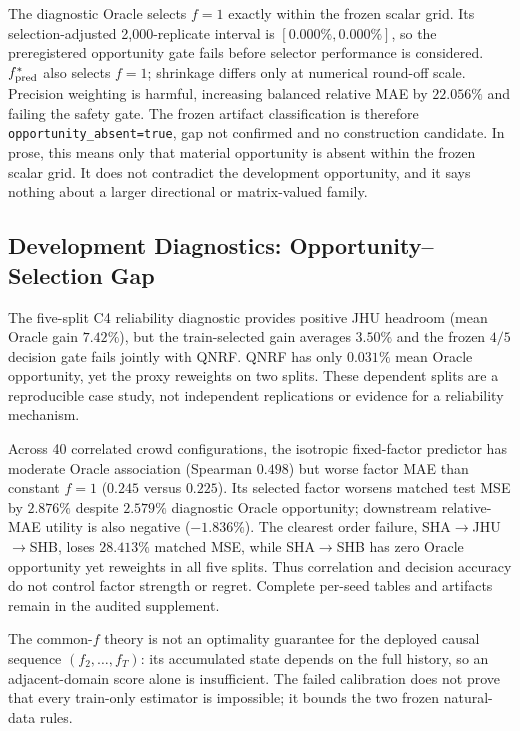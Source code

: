 \documentclass[10pt]{article}
\begin{document}
The diagnostic Oracle selects $f=1$ exactly within the frozen scalar grid. Its
selection-adjusted
2,000-replicate interval is $[0.000\%,0.000\%]$, so the preregistered
opportunity gate fails before selector performance is considered.
$f^*_{\rm pred}$ also selects $f=1$; shrinkage differs only at numerical
round-off scale.  Precision weighting is harmful, increasing balanced
relative MAE by $22.056\%$ and failing the safety gate.  The frozen
artifact classification is therefore \texttt{opportunity\_absent=true}, gap
not confirmed and no construction candidate. In prose, this means only that
material opportunity is absent within the frozen scalar grid. It does not
contradict the development opportunity, and it says nothing about a larger
directional or matrix-valued family.

\FloatBarrier
\subsection{Development Diagnostics: Opportunity--Selection Gap}

The five-split C4 reliability diagnostic provides positive JHU headroom
(mean Oracle gain $7.42\%$), but the train-selected gain averages $3.50\%$
and the frozen $4/5$ decision gate fails jointly with QNRF.  QNRF has only
$0.031\%$ mean Oracle opportunity, yet the proxy reweights on two splits.
These dependent splits are a reproducible case study, not independent
replications or evidence for a reliability mechanism.

Across 40 correlated crowd configurations, the isotropic fixed-factor
predictor has moderate Oracle association (Spearman $0.498$) but worse factor
MAE than constant $f=1$ ($0.245$ versus $0.225$).  Its selected factor worsens
matched test MSE by $2.876\%$ despite $2.579\%$ diagnostic Oracle opportunity;
downstream relative-MAE utility is also negative ($-1.836\%$).  The clearest
order failure, SHA$\to$JHU$\to$SHB, loses $28.413\%$ matched MSE, while
SHA$\to$SHB has zero Oracle opportunity yet reweights in all five splits.
Thus correlation and decision accuracy do not control factor strength or
regret.  Complete per-seed tables and artifacts remain in the audited
supplement.

The common-$f$ theory is not an optimality guarantee for the deployed causal
sequence $(f_2,\ldots,f_T)$: its accumulated state depends on the full history,
so an adjacent-domain score alone is insufficient.  The failed calibration
does not prove that every train-only estimator is impossible; it bounds the
two frozen natural-data rules.
\end{document}
